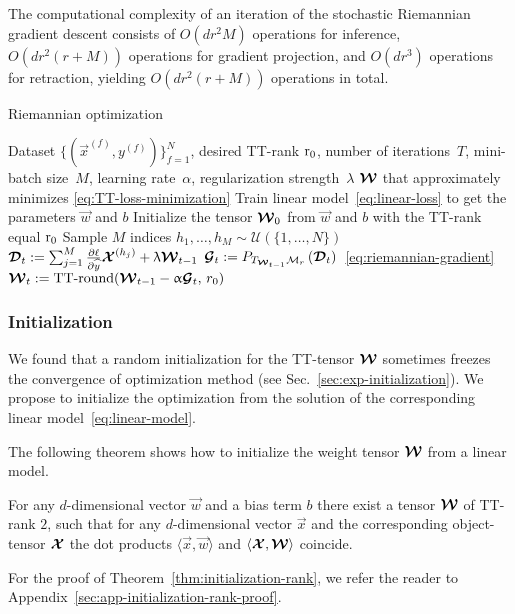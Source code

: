 The computational complexity of an iteration of the stochastic Riemannian gradient descent consists of $O(dr^2M)$ operations for inference, $O(dr^2(r + M))$ operations for gradient projection, and $O(dr^3)$ operations for retraction, yielding $O(dr^2(r + M))$ operations in total.

\begin{algorithm}[t]
   \caption{Riemannian optimization}
   \label{alg:rimeannian-optimization}
\begin{algorithmic}
    Dataset $\{(\vec{x}^{(f)}, y^{(f)})\}_{f=1}^N$, desired TT-rank $\operatorname{r}_0$, number of iterations~$T$, mini-batch size~$M$, learning rate~$\alpha$, regularization strength~$\lambda$
    $\boldsymbol{\mathcal{W}}$ that approximately minimizes \eqref{eq:TT-loss-minimization}
   \STATE Train linear model~\eqref{eq:linear-loss} to get the parameters $\vec{w}$ and $b$
   \STATE Initialize the tensor $\boldsymbol{\mathcal{W}}_0$ from $\vec{w}$ and $b$ with the TT-rank equal $\operatorname{r}_0$
        \STATE Sample $M$ indices $h_1, \ldots, h_M \sim \mathcal{U}(\{1, \ldots, N\})$
        \STATE $\boldsymbol{\mathcal{D}}_t := \sum_{j=1}^M \frac{\partial \ell}{\partial \widehat{y}} \boldsymbol{\mathcal{X}}^{(h_j)}  + \uplambda \boldsymbol{\mathcal{W}}_{t-1}$
        \STATE $\boldsymbol{\mathcal{G}}_t := P_{T_{\boldsymbol{\mathcal{W}}_{t-1}} \mathcal{M}_r}\left ( \boldsymbol{\mathcal{D}}_t \right)$~\eqref{eq:riemannian-gradient}
        \STATE $\boldsymbol{\mathcal{W}}_{t} := \operatorname{TT-round}(\boldsymbol{\mathcal{W}}_{t-1} - \upalpha \boldsymbol{\mathcal{G}}_t, \,r_0)$
   \ENDFOR
\end{algorithmic}
\end{algorithm}


\subsubsection{Initialization \label{sec:initialization}}
We found that a random initialization for the TT-tensor $\boldsymbol{\mathcal{W}}$ sometimes freezes the convergence of optimization method (see Sec.~\ref{sec:exp-initialization}).
We propose to initialize the optimization from the solution of the corresponding linear model~\eqref{eq:linear-model}.

The following theorem shows how to initialize the weight tensor $\boldsymbol{\mathcal{W}}$ from a linear model.
\begin{theorem}
\label{thm:initialization-rank}
For any $d$-dimensional vector $\vec{w}$ and a bias term $b$ there exist a tensor $\boldsymbol{\mathcal{W}}$ of TT-rank $2$, such that for any $d$-dimensional vector $\vec{x}$ and the corresponding object-tensor $\boldsymbol{\mathcal{X}}$ the dot products $\langle \vec{x}, \vec{w} \rangle$ and $\langle \boldsymbol{\mathcal{X}}, \boldsymbol{\mathcal{W}} \rangle$ coincide.
\end{theorem}
For the proof of Theorem~\ref{thm:initialization-rank}, we refer the reader to Appendix~\ref{sec:app-initialization-rank-proof}.

